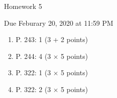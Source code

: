 \documentclass{article}
\begin{document}
\begin{center} \LARGE
Homework 5
\end{center}
\begin{center} \Large
Due Feburary 20, 2020 at 11:59 PM 
\end{center}



\begin{enumerate}
	\item P. 243: 1 (3 + 2 points)
	\item P. 244: 4 (3 $\times$ 5 points)
	\item P. 322: 1 (3 $\times$ 5 points)
	\item P. 322: 2 (3 $\times$ 5 points)
\end{enumerate}
% 
%
\end{document}
